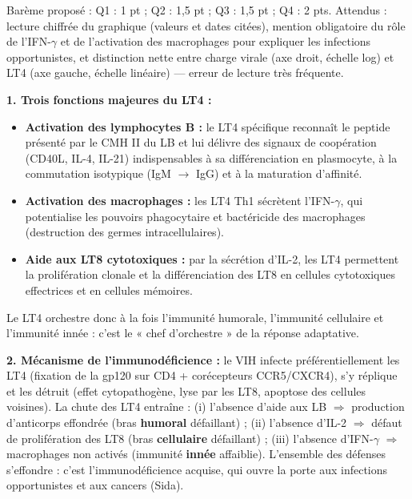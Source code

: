 \documentclass[11pt]{article}
\newcommand{\cle}[1]{{\popxbold\color{popdark}#1}}
\begin{document}
\begin{attention}
Barème proposé : Q1 : 1 pt ; Q2 : 1,5 pt ; Q3 : 1,5 pt ; Q4 : 2 pts. Attendus : lecture chiffrée du graphique (valeurs et dates citées), mention obligatoire du rôle de l'IFN-$\gamma$ et de l'activation des macrophages pour expliquer les infections opportunistes, et distinction nette entre charge virale (axe droit, échelle log) et LT4 (axe gauche, échelle linéaire) — erreur de lecture très fréquente.
\end{attention}

\begin{corrige}
\textbf{1. Trois fonctions majeures du LT4 :}
\begin{itemize}
    \item \textbf{Activation des lymphocytes B :} le LT4 spécifique reconnaît le peptide présenté par le CMH II du LB et lui délivre des signaux de coopération (CD40L, IL-4, IL-21) indispensables à sa différenciation en plasmocyte, à la commutation isotypique (IgM $\to$ IgG) et à la maturation d'affinité.
    \item \textbf{Activation des macrophages :} les LT4 Th1 sécrètent l'\cle{IFN-$\gamma$}, qui potentialise les pouvoirs phagocytaire et bactéricide des macrophages (destruction des germes intracellulaires).
    \item \textbf{Aide aux LT8 cytotoxiques :} par la sécrétion d'\cle{IL-2}, les LT4 permettent la prolifération clonale et la différenciation des LT8 en cellules cytotoxiques effectrices et en cellules mémoires.
\end{itemize}
Le LT4 orchestre donc à la fois l'immunité humorale, l'immunité cellulaire et l'immunité innée : c'est le « chef d'orchestre » de la réponse adaptative.

\textbf{2. Mécanisme de l'immunodéficience :} le VIH infecte préférentiellement les LT4 (fixation de la gp120 sur CD4 + corécepteurs CCR5/CXCR4), s'y réplique et les détruit (effet cytopathogène, lyse par les LT8, apoptose des cellules voisines). La chute des LT4 entraîne : (i) l'absence d'aide aux LB $\Rightarrow$ production d'anticorps effondrée (bras \textbf{humoral} défaillant) ; (ii) l'absence d'IL-2 $\Rightarrow$ défaut de prolifération des LT8 (bras \textbf{cellulaire} défaillant) ; (iii) l'absence d'IFN-$\gamma$ $\Rightarrow$ macrophages non activés (immunité \textbf{innée} affaiblie). L'ensemble des défenses s'effondre : c'est l'immunodéficience acquise, qui ouvre la porte aux infections opportunistes et aux cancers (Sida).


\end{corrige}
\end{document}
